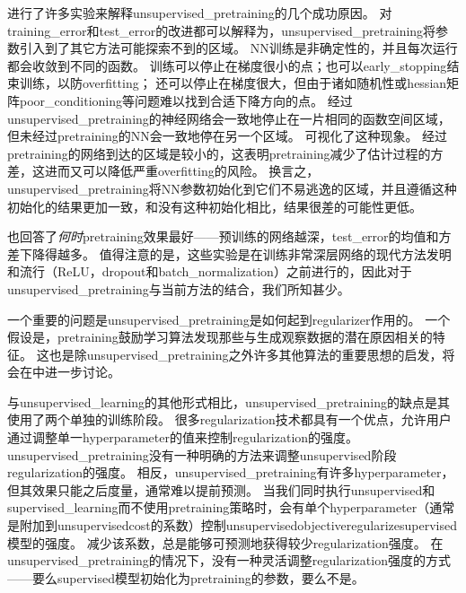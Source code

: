 \cite{Erhan+al-2010-small}进行了许多实验来解释\gls{unsupervised_pretraining}的几个成功原因。
对\gls{training_error}和\gls{test_error}的改进都可以解释为，\gls{unsupervised_pretraining}将参数引入到了其它方法可能探索不到的区域。
\gls{NN}训练是非确定性的，并且每次运行都会收敛到不同的函数。
训练可以停止在梯度很小的点；也可以\gls{early_stopping}结束训练，以防\gls{overfitting}；
还可以停止在梯度很大，但由于诸如随机性或\gls{hessian}矩阵\gls{poor_conditioning}等问题难以找到合适下降方向的点。
经过\gls{unsupervised_pretraining}的神经网络会一致地停止在一片相同的函数空间区域，但未经过\gls{pretraining}的\gls{NN}会一致地停在另一个区域。
可视化了这种现象。
经过\gls{pretraining}的网络到达的区域是较小的，这表明\gls{pretraining}减少了估计过程的方差，这进而又可以降低严重\gls{overfitting}的风险。
换言之，\gls{unsupervised_pretraining}将\gls{NN}参数初始化到它们不易逃逸的区域，并且遵循这种初始化的结果更加一致，和没有这种初始化相比，结果很差的可能性更低。


\cite{Erhan+al-2010-small}也回答了\emph{何时}\gls{pretraining}效果最好——预训练的网络越深，\gls{test_error}的均值和方差下降得越多。
值得注意的是，这些实验是在训练非常深层网络的现代方法发明和流行（\gls{ReLU}，\gls{dropout}和\gls{batch_normalization}）之前进行的，因此对于\gls{unsupervised_pretraining}与当前方法的结合，我们所知甚少。



一个重要的问题是\gls{unsupervised_pretraining}是如何起到\gls{regularizer}作用的。
一个假设是，\gls{pretraining}鼓励学习算法发现那些与生成观察数据的潜在原因相关的特征。
这也是除\gls{unsupervised_pretraining}之外许多其他算法的重要思想的启发，将会在中进一步讨论。



与\gls{unsupervised_learning}的其他形式相比，\gls{unsupervised_pretraining}的缺点是其使用了两个单独的训练阶段。
很多\gls{regularization}技术都具有一个优点，允许用户通过调整单一\gls{hyperparameter}的值来控制\gls{regularization}的强度。
\gls{unsupervised_pretraining}没有一种明确的方法来调整\gls{unsupervised}阶段\gls{regularization}的强度。
相反，\gls{unsupervised_pretraining}有许多\gls{hyperparameter}，但其效果只能之后度量，通常难以提前预测。
当我们同时执行\gls{unsupervised}和\gls{supervised_learning}而不使用\gls{pretraining}策略时，会有单个\gls{hyperparameter}（通常是附加到\gls{unsupervised}\gls{cost}的系数）控制\gls{unsupervised}\gls{objective}\gls{regularize}\gls{supervised}模型的强度。
减少该系数，总是能够可预测地获得较少\gls{regularization}强度。
在\gls{unsupervised_pretraining}的情况下，没有一种灵活调整\gls{regularization}强度的方式——要么\gls{supervised}模型初始化为\gls{pretraining}的参数，要么不是。

